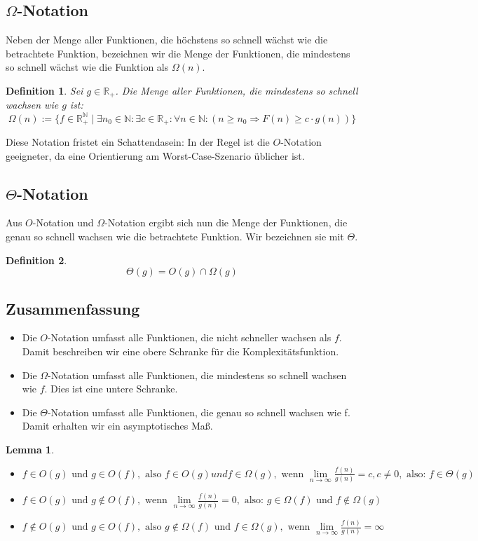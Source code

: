 \documentclass[11pt,a4paper]{scrartcl}
\newtheorem{definition}{Definition}
\newtheorem{lemma}{Lemma}
\begin{document}
\subsection{$\Omega$-Notation}
Neben der Menge aller Funktionen, die höchstens so schnell wächst wie die betrachtete Funktion, bezeichnen wir die Menge der Funktionen, die mindestens so schnell wächst wie die Funktion als $\Omega(n)$.
\begin{definition} Sei $g \in \mathbb{R_{+}}$. Die Menge aller Funktionen, die mindestens so schnell wachsen wie $g$ ist: 
\[\Omega(n) := \{ f \in \mathbb{R_{+}^{\mathbb{N}}} \mid \exists n_{0} \in \mathbb{N}: \exists c \in \mathbb{R_{+}}: \forall n \in \mathbb{N}: (n \geq n_{0} \Rightarrow F(n) \geq c \cdot g(n))\}\]
\end{definition}
Diese Notation fristet ein Schattendasein: In der Regel ist die $O$-Notation geeigneter, da eine Orientierung am {\glqq}Worst-Case-Szenario{\grqq} üblicher ist.
\subsection{$\Theta$-Notation}
Aus $O$-Notation und $\Omega$-Notation ergibt sich nun die Menge der Funktionen, die genau so schnell wachsen wie die betrachtete Funktion. Wir bezeichnen sie mit $\Theta$.
\begin{definition}
\[\Theta(g) = O(g) \cap \Omega(g)\]
\end{definition}
\subsection{Zusammenfassung}
\begin{itemize}
\item Die $O$-Notation umfasst alle Funktionen, die nicht schneller wachsen als $f$. Damit beschreiben wir eine obere Schranke für die Komplexitätsfunktion.
\item Die $\Omega$-Notation umfasst alle Funktionen, die mindestens so schnell wachsen wie $f$. Dies ist eine untere Schranke.
\item Die $\Theta$-Notation umfasst alle Funktionen, die genau so schnell wachsen wie f. Damit erhalten wir ein asymptotisches Maß.  
\end{itemize}
\begin{lemma}
\begin{itemize}
\item $f \in O(g) \text{ und } g \in O(f), \text{ also } f \in O(g) und f \in \Omega (g), \text{ wenn } \lim \limits_{n \to \infty} \frac{f(n)}{g(n)} = c, c \neq 0, \text{ also: } f \in \Theta (g)$
\item $f \in O(g) \text{ und } g \notin O(f), \text{ wenn } \lim \limits_{n \to \infty} \frac{f(n)}{g(n)} = 0, \text{ also: } g \in \Omega (f) \text{ und } f \notin \Omega (g)$
\item $ f \notin O(g) \text{ und } g \in O(f), \text{ also } g \notin \Omega (f) \text{ und } f \in \Omega (g), \text{ wenn } \lim \limits_{n \to \infty} \frac{f(n)}{g(n)} = \infty$
\end{itemize}
\end{lemma}
\end{document}
